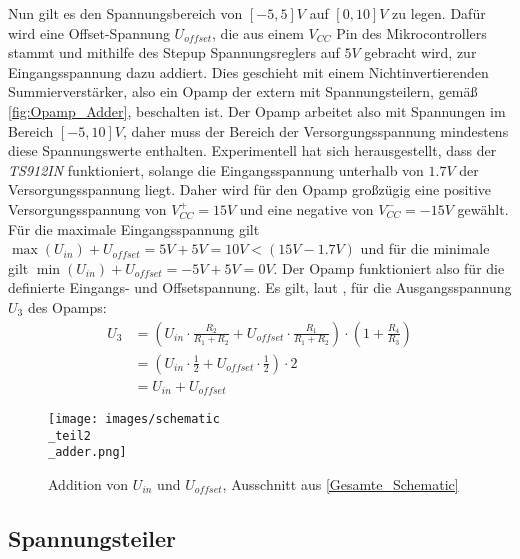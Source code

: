 Nun gilt es den Spannungsbereich von $[-5, 5]V$ auf $[0, 10]V$ zu legen.
Dafür wird eine Offset-Spannung $U_{offset}$, die aus einem $V_{CC}$ Pin
des Mikrocontrollers stammt und mithilfe des Stepup Spannungsreglers auf $5V$ gebracht wird, zur Eingangsspannung dazu addiert.
Dies geschieht mit einem Nichtinvertierenden Summierverstärker, also ein Opamp der extern mit
Spannungsteilern, gemäß \autoref{fig:Opamp_Adder}, beschalten ist.
Der Opamp arbeitet also mit Spannungen im Bereich $[-5,10]V$,
daher muss der Bereich der Versorgungsspannung mindestens diese Spannungswerte enthalten.
Experimentell hat sich herausgestellt, dass der \textit{TS912IN} funktioniert, solange die Eingangsspannung
unterhalb von $1.7V$ der Versorgungsspannung liegt.
Daher wird für den Opamp großzügig eine positive Versorgungsspannung von $V^+_{CC} = 15V$ und eine 
negative von $V^-_{CC} = -15V$ gewählt.
Für die maximale Eingangsspannung gilt $\max(U_{in}) + U_{offset} = 5V + 5V = 10V < (15V - 1.7V)$
und für die minimale gilt $\min(U_{in}) + U_{offset} = -5V + 5V = 0V$.
Der Opamp funktioniert also für die definierte Eingangs- und Offsetspannung. \newline
Es gilt, laut \cite{Opamp_adder}, für die Ausgangsspannung $U_3$ des Opamps:
\begin{align*}
U_3 &= (U_{in} \cdot \frac{R_2}{R_1 + R_2} + U_{offset} \cdot \frac{R_1}{R_1 + R_2}) \cdot(1 + \frac{R_4}{R_3}) \\
	&= (U_{in} \cdot \frac{1}{2} + U_{offset} \cdot \frac{1}{2}) \cdot 2 \\
	&= U_{in} + U_{offset}
\end{align*}

\begin{figure}[h!]
	\centering
	\texttt{[image: images/schematic\\\_teil2\\\_adder.png]}
	\caption{Addition von $U_{in}$ und $U_{offset}$, Ausschnitt aus \ref{Gesamte_Schematic}}
	\label{fig:Opamp_Adder}
\end{figure}


\subsection{Spannungsteiler}
\label{Spannungsteiler}

